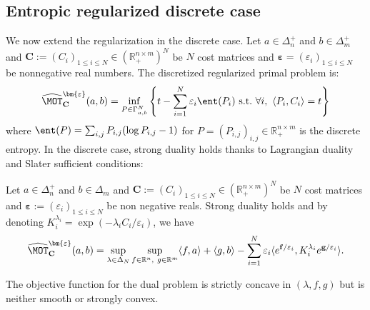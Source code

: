 \subsection{Entropic regularized discrete case}
\label{dis:entropic}


We now extend the regularization in the discrete case. 
Let $a\in\Delta_n^{+}$ and $b\in\Delta^+_m$ and $\mathbf{C}:=(C_i)_{1\leq i\leq N}\in\left(\mathbb{R}_+^{n\times m}\right)^N$ be $N$ cost matrices and $\bm{\varepsilon}=(\varepsilon_i)_{1\leq i\leq N}$ be nonnegative real numbers. The discretized regularized primal problem is:
\begin{align*}
    \widehat{\MOT}^{\bm{\varepsilon}}_{\mathbf{C}}(a,b)=\inf_{P\in \Gamma_{a,b}^N} \left\{t -\sum_{i=1}^N\varepsilon_i \ent(P_i) ~\mathrm{s.t.}~\forall i,~\langle P_i,C_i\rangle=t\right\}
\end{align*}
where $\ent(P) = \sum_{i,j}P_{i,j}(\log P_{i,j}-1)$ for $P=(P_{i,j})_{i,j}\in \mathbb{R}_+^{n\times m}$ is the discrete entropy. In the discrete case, strong duality holds thanks to Lagrangian duality and Slater sufficient conditions:
 
\begin{prop}
\label{prop:discrete-reg-dual}
Let $a\in\Delta_n^{+}$ and $b\in\Delta_m$ and $\mathbf{C}:=(C_i)_{1\leq i\leq N}\in\left(\mathbb{R}_+^{n\times m}\right)^N$ be $N$ cost matrices and $\bm{\varepsilon}:=(\varepsilon_i)_{1\leq i\leq N}$ be non negative reals. Strong duality holds and by denoting $K_i^{\lambda_i} =\exp\left(-\lambda_i C_{i}/\varepsilon_i\right)$, we have
\begin{align*}
\widehat{\MOT}_{\mathbf{C}}^{\bm{\varepsilon}}(a,b)=\sup_{\lambda\in\Delta_N}\sup\limits_{f\in \mathbb{R}^n,~g\in \mathbb{R}^m} \langle f, a\rangle+\langle g,b\rangle-\sum_{i=1}^N\varepsilon_i\langle e^{\mathbf{f}/\varepsilon_i},K_i^{\lambda_i} e^{\mathbf{g}/\varepsilon_i}\rangle.
\end{align*}
\end{prop}
The objective function for the dual problem is strictly concave in $(\lambda,f,g)$ but is neither smooth or strongly convex. 


